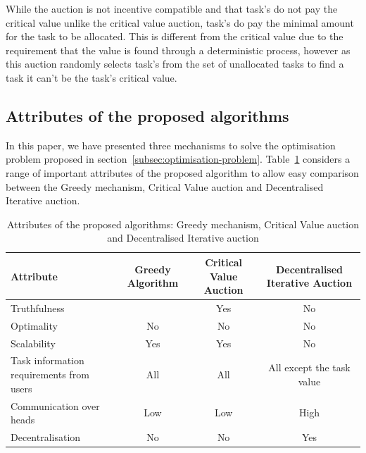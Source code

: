 While the auction is not incentive compatible and that task's do not pay the critical value unlike the critical value
auction, task's do pay the minimal amount for the task to be allocated. This is different from the critical value due
to the requirement that the value is found through a deterministic process, however as this auction randomly selects
task's from the set of unallocated tasks to find a task it can't be the task's critical value.

\subsection{Attributes of the proposed algorithms}
\label{subsec:attributes-of-proposed-algorithms}
In this paper, we have presented three mechanisms to solve the optimisation problem proposed in
section~\ref{subsec:optimisation-problem}. Table~\ref{tab:attributes_algorithms} considers a range of
important attributes of the proposed algorithm to allow easy comparison between the Greedy mechanism,
Critical Value auction and Decentralised Iterative auction.

\begin{table}[H]
    \begin{tabular}{|p{3cm}|c|c|c|}
        \hline
        \textbf{Attribute} & Greedy Algorithm & Critical Value Auction & Decentralised Iterative Auction \\ \hline
        Truthfulness & & Yes & No \\ \hline
        Optimality & No  & No & No \\ \hline
        Scalability & Yes & Yes & No \\ \hline
        Task information requirements from users & All & All & All except the task value \\ \hline
        Communication over heads & Low & Low & High \\ \hline
        Decentralisation & No  & No  & Yes \\ \hline
    \end{tabular}
    \caption{Attributes of the proposed algorithms: Greedy mechanism, Critical Value auction and
    Decentralised Iterative auction}
    \label{tab:attributes_algorithms}
\end{table}
